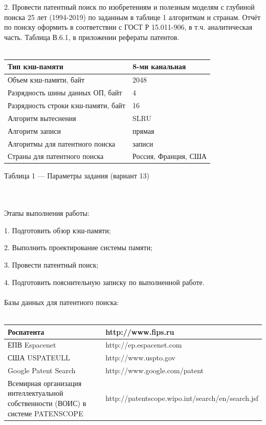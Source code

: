 \documentclass[13pt]{article}
\begin{document}
	2. Провести патентный поиск по изобретениям и полезным моделям с глубиной поиска 25 лет (1994-2019) по заданным в таблице 1 алгоритмам и странам. Отчёт по поиску оформить в соответствии с ГОСТ Р 15.011-906, в т.ч. аналитическая часть. Таблица В.6.1, в приложении рефераты патентов.\\\\
	\begin{tabular}{ | p{200pt} | p{220pt} |}
	\hline
	Тип кэш-памяти & 8-ми канальная \\ \hline
	Объем кэш-памяти, байт & 2048 \\ \hline
    Разрядность шины данных ОП, байт & 4 \\ \hline
	Разрядность строки кэш-памяти, байт & 16 \\ \hline
	Алгоритм вытеснения & SLRU \\ \hline
	Алгоритм записи & прямая \\ \hline
	Алгоритмы для патентного поиска & записи \\ \hline
	Страны для патентного поиска & Россия, Франция, США \\ \hline
    \end{tabular}
    \begin{center}Таблица 1 --- Параметры задания (вариант 13)\end{center} \\\\
    Этапы выполнения работы:
    
    1. Подготовить обзор кэш-памяти;        
    
    2. Выполнить проектирование системы памяти;
    
    3. Провести патентный поиск;
    
    4. Подготовить пояснительную записку по выполненной работе.\\\\
    Базы данных для патентного поиска:\\\\
    \begin{tabular}{ | p{200pt} | p{220pt} |}
	\hline
	Роспатента & http://www.fips.ru \\ \hline
	ЕПВ Espacenet & http://ep.espacenet.com \\ \hline
    США USPATEULL & http://www.uspto.gov \\ \hline
	Google Patent Search & http://www.google.com/patent \\ \hline
	Всемирная организация интеллектуальной собственности (ВОИС) в системе PATENSCOPE & http://patentscope.wipo.int/search/en/search.jsf \\ \hline
    \end{tabular} 
    \newpage
\end{document}
